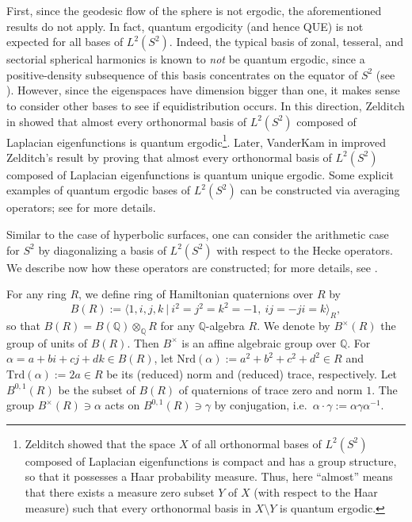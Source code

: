 \documentclass[11pt]{amsart}
\theoremstyle{definition}
\begin{document}
First, since the geodesic flow of the sphere is not ergodic, the aforementioned results do not apply. In fact, quantum ergodicity (and hence QUE) is not expected for all bases of $L^2(S^2)$. Indeed, the typical basis of zonal, tesseral, and sectorial spherical harmonics is known to \textit{not} be quantum ergodic, since a positive-density subsequence of this basis concentrates on the equator of $S^2$ (see \cite[pp.~497--498]{deVerdiere85}). However, since the eigenspaces have dimension bigger than one, it makes sense to consider other bases to see if equidistribution occurs. In this direction, Zelditch in \cite{ZelditchQES2} showed that almost every orthonormal basis of $L^2(S^2)$ composed of Laplacian eigenfunctions is quantum ergodic\footnote{Zelditch showed that the space $X$ of all orthonormal bases of $L^2(S^2)$ composed of Laplacian eigenfunctions is compact and has a group structure, so that it possesses a Haar probability measure. Thus, here ``almost'' means that there exists a measure zero subset $Y$ of $X$ (with respect to the Haar measure) such that every orthonormal basis in $X \setminus Y$ is quantum ergodic.}. Later, VanderKam in \cite[Thm.~1.3]{VanderKam} improved Zelditch's result by proving that almost every orthonormal basis of $L^2(S^2)$ composed of Laplacian eigenfunctions is quantum unique ergodic. Some explicit examples of quantum ergodic bases of $L^2(S^2)$ can be constructed via averaging operators; see \cite{BLLQE} for more details.

Similar to the case of hyperbolic surfaces, one can consider the arithmetic case for $S^2$ by diagonalizing a basis of $L^2(S^2)$ with respect to the Hecke operators. We describe now how these operators are constructed; for more details, see \cite{garza2025geodesicrestrictionproblemarithmetic}. 

For any ring $R$, we define ring of Hamiltonian quaternions over $R$ by $$B(R) := \langle 1,i,j,k \: | \: i^2=j^2=k^2=-1, \: ij=-ji=k\rangle_R,$$ so that $B(R) = B(\mathbb{Q}) \otimes_{\mathbb{Q}} R$ for any $\mathbb{Q}$-algebra $R$. We denote by $B^{\times}(R)$ the group of units of $B(R)$. Then $B^{\times}$ is an affine algebraic group over $\mathbb{Q}$. For $\alpha = a+bi+cj+dk \in B(R)$, let $\mathrm{Nrd}(\alpha) := a^2+b^2+c^2+d^2 \in R$ and $\mathrm{Trd}(\alpha) := 2a \in R$ be its (reduced) norm and (reduced) trace, respectively. Let $B^{0,1}(R)$ be the subset of $B(R)$ of quaternions of trace zero and norm $1$. The group $B^{\times}(R)\ni \alpha$ acts on $B^{0,1}(R) \ni \gamma$ by conjugation, i.e.~$\alpha \cdot \gamma := \alpha \gamma \alpha^{-1}$. 
\end{document}
